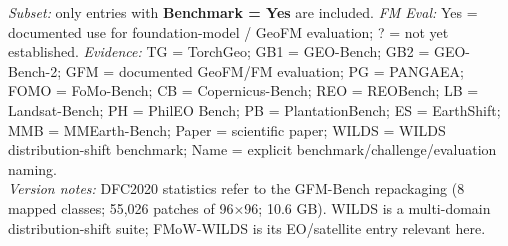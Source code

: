 \vspace{0.25em}
{\fontsize{5.6}{6.5}\selectfont
\noindent\textit{Subset:} only entries with \textbf{Benchmark = Yes} are included.
\quad
\textit{FM Eval:} Yes = documented use for foundation-model / GeoFM evaluation; ? = not yet established.
\quad
\textit{Evidence:} TG = TorchGeo; GB1 = GEO-Bench; GB2 = GEO-Bench-2; GFM = documented GeoFM/FM evaluation;
PG = PANGAEA; FOMO = FoMo-Bench; CB = Copernicus-Bench; REO = REOBench; LB = Landsat-Bench;
PH = PhilEO Bench; PB = PlantationBench; ES = EarthShift; MMB = MMEarth-Bench; Paper = scientific paper;
WILDS = WILDS distribution-shift benchmark; Name = explicit benchmark/challenge/evaluation naming.
\\
\textit{Version notes:} DFC2020 statistics refer to the GFM-Bench repackaging (8 mapped classes; 55,026 patches of 96$\times$96; 10.6 GB). WILDS is a multi-domain distribution-shift suite; FMoW-WILDS is its EO/satellite entry relevant here.
}
\endgroup
\restoregeometry
